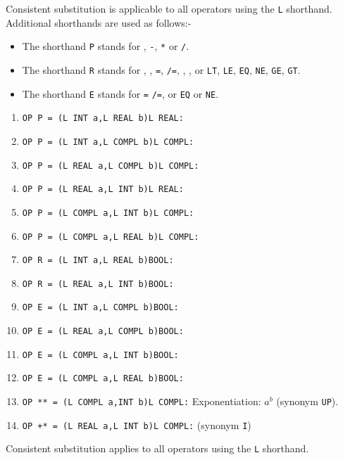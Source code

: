 Consistent substitution is applicable to all operators using the
\verb|L| shorthand. Additional shorthands are used as follows:-
\begin{itemize}
\item The shorthand \verb|P| stands for
, \verb|-|, \verb|*| or \verb|/|.
\item The shorthand \verb|R| stands for
\ixtt{<}, \ixtt{<=}, \verb|=|, \verb|/=|, \ixtt{>=}, \ixtt{>},\newline
or \verb|LT|, \verb|LE|, \verb|EQ|, \verb|NE|, \verb|GE|, \verb|GT|.
\item The shorthand \verb|E| stands for \verb|=| \verb|/=|,\newline
or \verb|EQ| or \verb|NE|.
\end{itemize}
\medskip
\begin{enumerate}
\item \verb|OP P = (L INT a,L REAL b)L REAL:|
\item \verb|OP P = (L INT a,L COMPL b)L COMPL:|
\item \verb|OP P = (L REAL a,L COMPL b)L COMPL:|
\item \verb|OP P = (L REAL a,L INT b)L REAL:|
\item \verb|OP P = (L COMPL a,L INT b)L COMPL:|
\item \verb|OP P = (L COMPL a,L REAL b)L COMPL:|
\item \verb|OP R = (L INT a,L REAL b)BOOL:|
\item \verb|OP R = (L REAL a,L INT b)BOOL:|
\item \verb|OP E = (L INT a,L COMPL b)BOOL:|
\item \verb|OP E = (L REAL a,L COMPL b)BOOL:|
\item \verb|OP E = (L COMPL a,L INT b)BOOL:|
\item \verb|OP E = (L COMPL a,L REAL b)BOOL:|
\item {}\newline
\verb|OP ** = (L COMPL a,INT b)L COMPL:|\newline
Exponentiation: $a^b$ (synonym \texttt{UP}).
\item {}
\newline
\verb|OP +* = (L REAL a,L INT b)L COMPL:|\newline
(synonym \texttt{I})
\end{enumerate}

Consistent substitution applies to all operators using the \verb|L|
shorthand.

